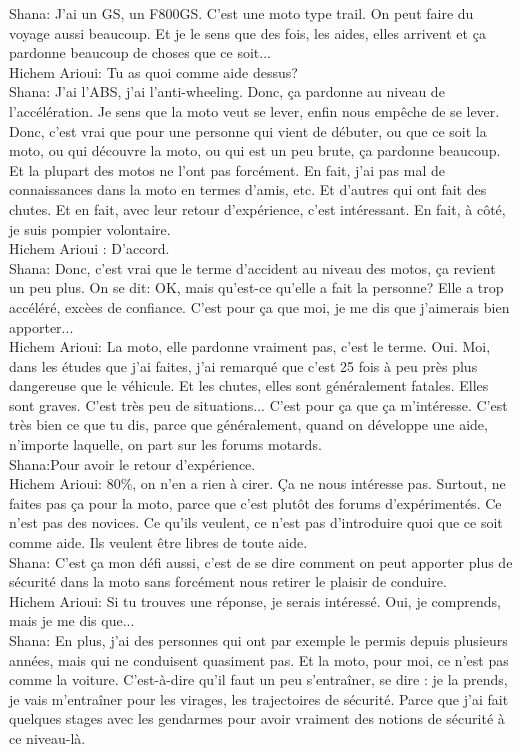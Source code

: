 Shana: J'ai un GS, un F800GS. C'est une moto type trail. On peut faire du voyage aussi beaucoup. Et je le sens que des fois, les aides, elles arrivent et ça pardonne beaucoup de choses que ce soit... \\
Hichem Arioui: Tu as quoi comme aide dessus? \\
Shana: J'ai l'ABS, j'ai l'anti-wheeling. Donc, ça pardonne au niveau de l'accélération. Je sens que la moto veut se lever, enfin nous empêche de se lever. Donc, c'est vrai que pour une personne qui vient de débuter, ou que ce soit la moto, ou qui découvre la moto, ou qui est un peu brute, ça pardonne beaucoup. Et la plupart des motos ne l'ont pas forcément. En fait, j'ai pas mal de connaissances dans la moto en termes d'amis, etc. Et d'autres qui ont fait des chutes. Et en fait, avec leur retour d'expérience, c'est intéressant. En fait, à côté, je suis pompier volontaire. \\
Hichem Arioui : D'accord. \\
Shana: Donc, c'est vrai que le terme d'accident au niveau des motos, ça revient un peu plus. On se dit: OK, mais qu'est-ce qu'elle a fait la personne? Elle a trop accéléré, excèes de confiance. C'est pour ça que moi, je me dis que j'aimerais bien apporter... \\
Hichem Arioui: La moto, elle pardonne vraiment pas, c'est le terme. Oui. Moi, dans les études que j'ai faites, j'ai remarqué que c'est 25 fois à peu près plus dangereuse que le véhicule. Et les chutes, elles sont généralement fatales. Elles sont graves. C'est très peu de situations... C'est pour ça que ça m'intéresse. C'est très bien ce que tu dis, parce que généralement, quand on développe une aide, n'importe laquelle, on part sur les forums motards. \\
Shana:Pour avoir le retour d'expérience. \\
Hichem Arioui: 80\%, on n'en a rien à cirer. Ça ne nous intéresse pas. Surtout, ne faites pas ça pour la moto, parce que c'est plutôt des forums d'expérimentés. Ce n'est pas des novices. Ce qu'ils veulent, ce n'est pas d'introduire quoi que ce soit comme aide. Ils veulent être libres de toute aide. \\
Shana: C'est ça mon défi aussi, c'est de se dire comment on peut apporter plus de sécurité dans la moto sans forcément nous retirer le plaisir de conduire. \\
Hichem Arioui: Si tu trouves une réponse, je serais intéressé. Oui, je comprends, mais je me dis que... \\
Shana: En plus, j'ai des personnes qui ont par exemple le permis depuis plusieurs années, mais qui ne conduisent quasiment pas. Et la moto, pour moi, ce n'est pas comme la voiture. C'est-à-dire qu'il faut un peu s'entraîner, se dire : je la prends, je vais m'entraîner pour les virages, les trajectoires de sécurité. Parce que j'ai fait quelques stages avec les gendarmes pour avoir vraiment des notions de sécurité à ce niveau-là. 
